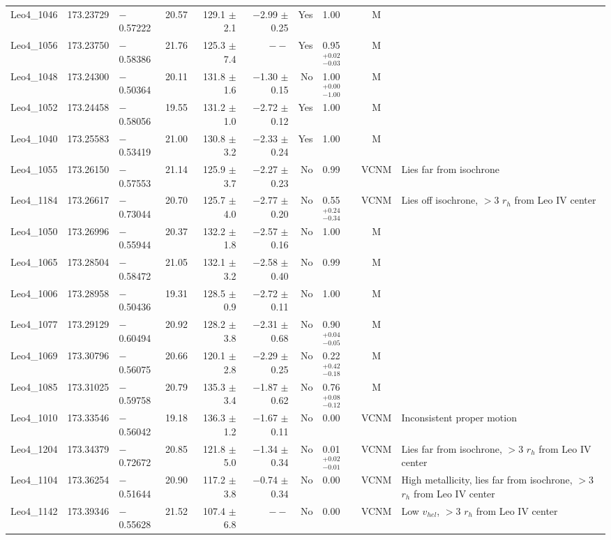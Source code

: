 \begin{table*}[t]
\begin{tabular}{lllrrrrlcl}
Leo4\_1046 & 173.23729 & $-$0.57222 & 20.57 & 129.1  $\pm$ 2.1 & $-$2.99  $\pm$ 0.25 & Yes & 1.00 & M & \\ 
Leo4\_1056 & 173.23750 & $-$0.58386 & 21.76 & 125.3  $\pm$ 7.4 & $--$ & Yes & 0.95$^{+0.02}_{-0.03}$ & M & \\ 
Leo4\_1048 & 173.24300 & $-$0.50364 & 20.11 & 131.8  $\pm$ 1.6 & $-$1.30  $\pm$ 0.15 & No & 1.00$^{+0.00}_{-1.00}$ & M & \\ 
Leo4\_1052 & 173.24458 & $-$0.58056 & 19.55 & 131.2  $\pm$ 1.0 & $-$2.72  $\pm$ 0.12 & Yes & 1.00 & M & \\ 
Leo4\_1040 & 173.25583 & $-$0.53419 & 21.00 & 130.8  $\pm$ 3.2 & $-$2.33  $\pm$ 0.24 & Yes & 1.00 & M & \\ 
Leo4\_1055 & 173.26150 & $-$0.57553 & 21.14 & 125.9  $\pm$ 3.7 & $-$2.27  $\pm$ 0.23 & No & 0.99 & VCNM & Lies far from isochrone\\ 
Leo4\_1184 & 173.26617 & $-$0.73044 & 20.70 & 125.7  $\pm$ 4.0 & $-$2.77  $\pm$ 0.20 & No & 0.55$^{+0.24}_{-0.34}$ & VCNM & Lies off isochrone, $>$3 $r_h$ from Leo IV center\\ 
Leo4\_1050 & 173.26996 & $-$0.55944 & 20.37 & 132.2  $\pm$ 1.8 & $-$2.57  $\pm$ 0.16 & No & 1.00 & M & \\ 
Leo4\_1065 & 173.28504 & $-$0.58472 & 21.05 & 132.1  $\pm$ 3.2 & $-$2.58  $\pm$ 0.40 & No & 0.99 & M & \\ 
Leo4\_1006 & 173.28958 & $-$0.50436 & 19.31 & 128.5  $\pm$ 0.9 & $-$2.72  $\pm$ 0.11 & No & 1.00 & M & \\ 
Leo4\_1077 & 173.29129 & $-$0.60494 & 20.92 & 128.2  $\pm$ 3.8 & $-$2.31  $\pm$ 0.68 & No & 0.90$^{+0.04}_{-0.05}$ & M & \\ 
Leo4\_1069 & 173.30796 & $-$0.56075 & 20.66 & 120.1  $\pm$ 2.8 & $-$2.29  $\pm$ 0.25 & No & 0.22$^{+0.42}_{-0.18}$ & M & \\ 
Leo4\_1085 & 173.31025 & $-$0.59758 & 20.79 & 135.3  $\pm$ 3.4 & $-$1.87  $\pm$ 0.62 & No & 0.76$^{+0.08}_{-0.12}$ & M & \\ 
Leo4\_1010 & 173.33546 & $-$0.56042 & 19.18 & 136.3  $\pm$ 1.2 & $-$1.67  $\pm$ 0.11 & No & 0.00 & VCNM & Inconsistent proper motion\\ 
Leo4\_1204 & 173.34379 & $-$0.72672 & 20.85 & 121.8  $\pm$ 5.0 & $-$1.34  $\pm$ 0.34 & No & 0.01$^{+0.02}_{-0.01}$ & VCNM & Lies far from isochrone, $>$3 $r_h$ from Leo IV center\\ 
Leo4\_1104 & 173.36254 & $-$0.51644 & 20.90 & 117.2  $\pm$ 3.8 & $-$0.74  $\pm$ 0.34 & No & 0.00 & VCNM & High metallicity, lies far from isochrone, $>$3 $r_h$ from Leo IV center\\ 
Leo4\_1142 & 173.39346 & $-$0.55628 & 21.52 & 107.4  $\pm$ 6.8 & $--$ & No & 0.00 & VCNM & Low $v_{hel}$, $>$3 $r_h$ from Leo IV center\\ 
\hline
\end{tabular}
\end{table*}